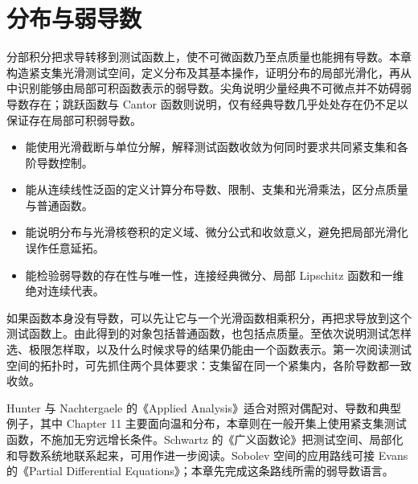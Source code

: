\chapter{分布与弱导数}
\label{b1:ch:20}
\begin{chapterabstract}
分部积分把求导转移到测试函数上，使不可微函数乃至点质量也能拥有导数。本章构造紧支集光滑测试空间，定义分布及其基本操作，证明分布的局部光滑化，再从中识别能够由局部可积函数表示的弱导数。尖角说明少量经典不可微点并不妨碍弱导数存在；跳跃函数与 Cantor 函数则说明，仅有经典导数几乎处处存在仍不足以保证存在局部可积弱导数。
\end{chapterabstract}

\begin{learninggoals}
\begin{itemize}
\item\label{b1:item:20-goal-tests}能使用光滑截断与单位分解，解释测试函数收敛为何同时要求共同紧支集和各阶导数控制。
\item\label{b1:item:20-goal-distributions}能从连续线性泛函的定义计算分布导数、限制、支集和光滑乘法，区分点质量与普通函数。
\item\label{b1:item:20-goal-smoothing}能说明分布与光滑核卷积的定义域、微分公式和收敛意义，避免把局部光滑化误作任意延拓。
\item\label{b1:item:20-goal-weak}能检验弱导数的存在性与唯一性，连接经典微分、局部 Lipschitz 函数和一维绝对连续代表。
\end{itemize}
\end{learninggoals}

如果函数本身没有导数，可以先让它与一个光滑函数相乘积分，再把求导放到这个测试函数上。由此得到的对象包括普通函数，也包括点质量。至依次说明测试怎样选、极限怎样取，以及什么时候求导的结果仍能由一个函数表示。第一次阅读测试空间的拓扑时，可先抓住两个具体要求：支集留在同一个紧集内，各阶导数都一致收敛。

\ProseParagraphBreak

Hunter 与 Nachtergaele 的《Applied Analysis》\cite[Chapter 11 and Section 12.9]{Hunter2001Applied}适合对照对偶配对、导数和典型例子，其中 Chapter 11 主要面向温和分布，本章则在一般开集上使用紧支集测试函数，不施加无穷远增长条件。Schwartz 的《广义函数论》\cite[第一至三章]{Schwartz2010DistributionsChinese}把测试空间、局部化和导数系统地联系起来，可用作进一步阅读。Sobolev 空间的应用路线可接 Evans 的《Partial Differential Equations》\cite[Chapter 5]{Evans2010Partial}；本章先完成这条路线所需的弱导数语言。

